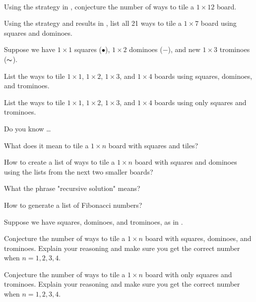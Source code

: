 \begin{exer}[\exerP] %
\label{exer_sq_dom7}
~
    \begin{apart}
        \item Using the strategy in , conjecture the number of ways to tile a $1 \times 12$ board.         
        \item Using the strategy and results in , list all 21 ways to tile a $1 \times 7$ board using squares and dominoes. 
    \end{apart}
\end{exer}

\begin{exer} [\exerU]%
\label{exer_trominoes_examples}
Suppose we have $1 \times 1$ squares ($\bullet$), $1 \times 2$ dominoes ($\boldsymbol{-}$), and new $1 \times 3$ trominoes ($\thicksim$).
    \begin{exerpart}
        \item List the ways to tile $1 \times 1$, $1 \times 2$, $1 \times 3$, and $1 \times 4$ boards using squares, dominoes, and trominoes.
        \item List the ways to tile $1 \times 1$, $1 \times 2$, $1 \times 3$, and $1 \times 4$ boards using only squares and trominoes.
    \end{exerpart}
\end{exer}

\begin{exer}[\exerR]
\label{exer_dyk_sq_dom}  
    Do you know \ldots 
        \begin{exerpart}
            \item What does it mean to tile a $1 \times n$ board with squares and tiles?
            \item How to create a list of ways to tile a $1 \times n$ board with squares and dominoes using the lists from the next two smaller boards?
            \item What the phrase "recursive solution" means?
            \item How to generate a list of Fibonacci numbers?
        \end{exerpart}
\end{exer}

\begin{exer} [\exerE]%
\label{exer_trominoes_conjectures}
Suppose we have squares, dominoes, and trominoes, as in .
    \begin{exerpart}
        \item Conjecture the number of ways to tile a $1 \times n$ board with squares, dominoes, and trominoes.  Explain your reasoning and make sure you get the correct number when $n=1,2,3,4$.
        \item Conjecture the number of ways to tile a $1 \times n$ board with only squares and trominoes.  Explain your reasoning and make sure you get the correct number when $n=1,2,3,4$.
    \end{exerpart}
\end{exer}

